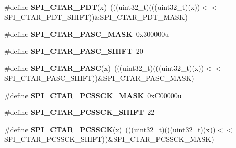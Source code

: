 \begin{DoxyCompactItemize}
\item 
\#define {\bfseries S\+P\+I\+\_\+\+C\+T\+A\+R\+\_\+\+P\+DT}(x)~(((uint32\+\_\+t)(((uint32\+\_\+t)(x))$<$$<$S\+P\+I\+\_\+\+C\+T\+A\+R\+\_\+\+P\+D\+T\+\_\+\+S\+H\+I\+FT))\&S\+P\+I\+\_\+\+C\+T\+A\+R\+\_\+\+P\+D\+T\+\_\+\+M\+A\+SK)\hypertarget{group__SPI__Register__Masks_ga9b8b72764c75d047a2b4deb5a6a15619}{}\label{group__SPI__Register__Masks_ga9b8b72764c75d047a2b4deb5a6a15619}

\item 
\#define {\bfseries S\+P\+I\+\_\+\+C\+T\+A\+R\+\_\+\+P\+A\+S\+C\+\_\+\+M\+A\+SK}~0x300000u\hypertarget{group__SPI__Register__Masks_ga3e9fd2ca2e90b6c40db0d51c8d8baa84}{}\label{group__SPI__Register__Masks_ga3e9fd2ca2e90b6c40db0d51c8d8baa84}

\item 
\#define {\bfseries S\+P\+I\+\_\+\+C\+T\+A\+R\+\_\+\+P\+A\+S\+C\+\_\+\+S\+H\+I\+FT}~20\hypertarget{group__SPI__Register__Masks_ga7883643ad4e73cc46c7a140375a2be7a}{}\label{group__SPI__Register__Masks_ga7883643ad4e73cc46c7a140375a2be7a}

\item 
\#define {\bfseries S\+P\+I\+\_\+\+C\+T\+A\+R\+\_\+\+P\+A\+SC}(x)~(((uint32\+\_\+t)(((uint32\+\_\+t)(x))$<$$<$S\+P\+I\+\_\+\+C\+T\+A\+R\+\_\+\+P\+A\+S\+C\+\_\+\+S\+H\+I\+FT))\&S\+P\+I\+\_\+\+C\+T\+A\+R\+\_\+\+P\+A\+S\+C\+\_\+\+M\+A\+SK)\hypertarget{group__SPI__Register__Masks_gae16156d09743ff57feb66a1e4c96d8c8}{}\label{group__SPI__Register__Masks_gae16156d09743ff57feb66a1e4c96d8c8}

\item 
\#define {\bfseries S\+P\+I\+\_\+\+C\+T\+A\+R\+\_\+\+P\+C\+S\+S\+C\+K\+\_\+\+M\+A\+SK}~0x\+C00000u\hypertarget{group__SPI__Register__Masks_ga27ec6f89727e91f1d272d06c6f1c44b3}{}\label{group__SPI__Register__Masks_ga27ec6f89727e91f1d272d06c6f1c44b3}

\item 
\#define {\bfseries S\+P\+I\+\_\+\+C\+T\+A\+R\+\_\+\+P\+C\+S\+S\+C\+K\+\_\+\+S\+H\+I\+FT}~22\hypertarget{group__SPI__Register__Masks_ga8bb5e598d3bbadd3efc273c57bc522ab}{}\label{group__SPI__Register__Masks_ga8bb5e598d3bbadd3efc273c57bc522ab}

\item 
\#define {\bfseries S\+P\+I\+\_\+\+C\+T\+A\+R\+\_\+\+P\+C\+S\+S\+CK}(x)~(((uint32\+\_\+t)(((uint32\+\_\+t)(x))$<$$<$S\+P\+I\+\_\+\+C\+T\+A\+R\+\_\+\+P\+C\+S\+S\+C\+K\+\_\+\+S\+H\+I\+FT))\&S\+P\+I\+\_\+\+C\+T\+A\+R\+\_\+\+P\+C\+S\+S\+C\+K\+\_\+\+M\+A\+SK)\hypertarget{group__SPI__Register__Masks_ga1d67f4830c56355cfbee79721e4d30d3}{}\label{group__SPI__Register__Masks_ga1d67f4830c56355cfbee79721e4d30d3}


\end{DoxyCompactItemize}
